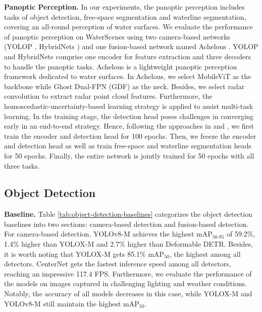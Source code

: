 \documentclass[lettersize,journal]{IEEEtran}
\begin{document}
\textbf{Panoptic Perception.} In our experiments, the panoptic perception includes tasks of object detection, free-space segmentation and waterline segmentation, covering an all-round perception of water surfaces. We evaluate the performance of panoptic perception on WaterScenes using two camera-based networks (YOLOP \cite{wu2022yolop}, HybridNets \cite{vu2022hybridnets}) and one fusion-based network named Achelous \cite{guan2023achelous}. 
YOLOP and HybridNets comprise one encoder for feature extraction and three decoders to handle the panoptic tasks. Achelous \cite{guan2023achelous} is a lightweight panoptic perception framework dedicated to water surfaces. 
In Achelous, we select MobileViT \cite{mehta2021mobilevit} as the backbone while Ghost Dual-FPN (GDF) as the neck. Besides, we select radar convolution to extract radar point cloud features. Furthermore, the homoscedastic-uncertainty-based learning strategy \cite{kendall2018multi} is applied to assist multi-task learning.
In the training stage, the detection head poses challenges in converging early in an end-to-end strategy. Hence, following the approaches in \cite{wu2022yolop} and \cite{vu2022hybridnets}, we first train the encoder and detection head for 100 epochs. Then, we freeze the encoder and detection head as well as train free-space and waterline segmentation heads for 50 epochs. Finally, the entire network is jointly trained for 50 epochs with all three tasks.

\subsection{Object Detection}

\textbf{Baseline.} Table \ref{tab:object-detection-baselines} categorizes the object detection baselines into two sections: camera-based detection and fusion-based detection.
For camera-based detection, YOLOv8-M achieves the highest mAP$_{50\text{-}95}$ of 59.2\%, 1.4\% higher than YOLOX-M and 2.7\% higher than Deformable DETR. Besides, it is worth noting that YOLOX-M gets 85.1\% mAP$_{50}$, the highest among all detectors. CenterNet gets the fastest inference speed among all detectors, reaching an impressive 117.4 FPS. 
Furthermore, we evaluate the performance of the models on images captured in challenging lighting and weather conditions. Notably, the accuracy of all models decreases in this case, while YOLOX-M and YOLOv8-M still maintain the highest mAP$_{50}$. 
\end{document}
